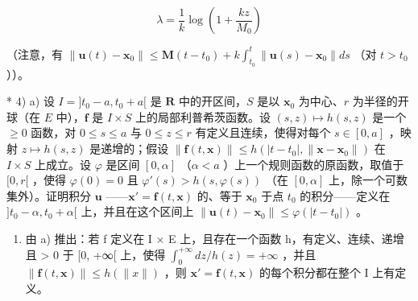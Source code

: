 \[
\lambda = \frac {1}{k} \log \left(1 + \frac {k z}{M _ {0}}\right)
\]

（注意，有 \(\| \mathbf{u}(t) - \mathbf{x}_0\| \leqslant \mathbf{M}(t - t_0) + k\int_{t_0}^t\| \mathbf{u}(s) - \mathbf{x}_0\| ds\) （对 \(t > t_0\) ））。

* 4) a) 设 \(I = ]t_0 - a, t_0 + a[\) 是 \(\mathbf{R}\) 中的开区间，\(S\) 是以 \(\mathbf{x}_0\) 为中心、\(r\) 为半径的开球（在 \(E\) 中），\(\mathbf{f}\) 是 \(I \times S\) 上的局部利普希茨函数。设 \((s, z) \mapsto h(s, z)\) 是一个 \(\geqslant 0\) 函数，对 \(0 \leqslant s \leqslant a\) 与 \(0 \leqslant z \leqslant r\) 有定义且连续，使得对每个 \(s \in [0, a]\) ，映射 \(z \mapsto h(s, z)\) 是递增的；假设 \(\| \mathbf{f}(t, \mathbf{x}) \| \leqslant h(|t - t_0|, \| \mathbf{x} - \mathbf{x}_0 \|)\) 在 \(I \times S\) 上成立。设 \(\varphi\) 是区间 \([0, \alpha]\) （\(\alpha < a\) ）上一个规则函数的原函数，取值于 \([0, r[\) ，使得 \(\varphi(0) = 0\) 且 \(\varphi'(s) > h(s, \varphi(s))\) （在 \([0, \alpha]\) 上，除一个可数集外）。证明积分 \(\mathbf{u}\) ——\(\mathbf{x}' = \mathbf{f}(t, \mathbf{x})\) 的、等于 \(\mathbf{x}_0\) 于点 \(t_0\) 的积分——定义在 \(]t_0 - \alpha, t_0 + \alpha[\) 上，并且在这个区间上 \(\| \mathbf{u}(t) - \mathbf{x}_0 \| \leqslant \varphi(|t - t_0|)\) 。

\begin{enumerate}
\def\labelenumi{\alph{enumi})}
\setcounter{enumi}{1}
\tightlist
\item
  由 a) 推出：若 f 定义在 I × E 上，且存在一个函数 h，有定义、连续、递增且 \textgreater{} 0 于 {[}0, +∞{[} 上，使得 \(\int_{0}^{+\infty} dz / h(z) = +\infty\) ，并且 \(\|\mathbf{f}(t, \mathbf{x})\| \leqslant h(\|x\|)\) ，则 \(\mathbf{x}' = \mathbf{f}(t, \mathbf{x})\) 的每个积分都在整个 I 上有定义。
\end{enumerate}

